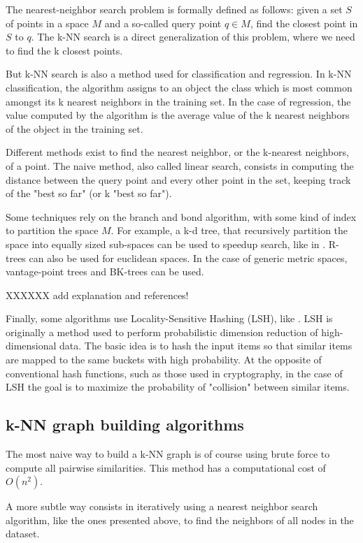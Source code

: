 \documentclass[wcp]{jmlr}
\begin{document}
The nearest-neighbor search problem is formally defined as follows: given a set $S$ of points in a space $M$ and a so-called query point $q \in M$, find the closest point in $S$ to $q$. The k-NN search is a direct generalization of this problem, where we need to find the k closest points.

But k-NN search is also a method used for classification and regression. In k-NN classification, the algorithm assigns to an object the class which is most common amongst its k nearest neighbors in the training set. In the case of regression, the value computed by the algorithm is the average value of the k nearest neighbors of the object in the training set.

Different methods exist to find the nearest neighbor, or the k-nearest neighbors, of a point. The naive method, also called linear search, consists in computing the distance between the query point and every other point in the set, keeping track of the "best so far" (or k "best so far").

Some techniques rely on the branch and bond algorithm, with some kind of index to partition the space $M$. For example, a k-d tree, that recursively partition the space into equally sized sub-spaces can be used to speedup search, like in \cite{Moore1991}. R-trees can also be used for euclidean spaces. In the case of generic metric spaces, vantage-point trees and BK-trees can be used.

XXXXXX add explanation and references!

Finally, some algorithms use Locality-Sensitive Hashing (LSH), like \cite{Rajaraman2010}. LSH is originally a method used to perform probabilistic dimension reduction of high-dimensional data. The basic idea is to hash the input items so that similar items are mapped to the same buckets with high probability. At the opposite of conventional hash functions, such as those used in cryptography, in the case of LSH the goal is to maximize the probability of "collision" between similar items.

\subsection{k-NN graph building algorithms}

The most naive way to build a k-NN graph is of course using brute force to compute all pairwise similarities. This method has a computational cost of $O(n^2)$.

A more subtle way consists in iteratively using a nearest neighbor search algorithm, like the ones presented above, to find the neighbors of all nodes in the dataset.
\end{document}
